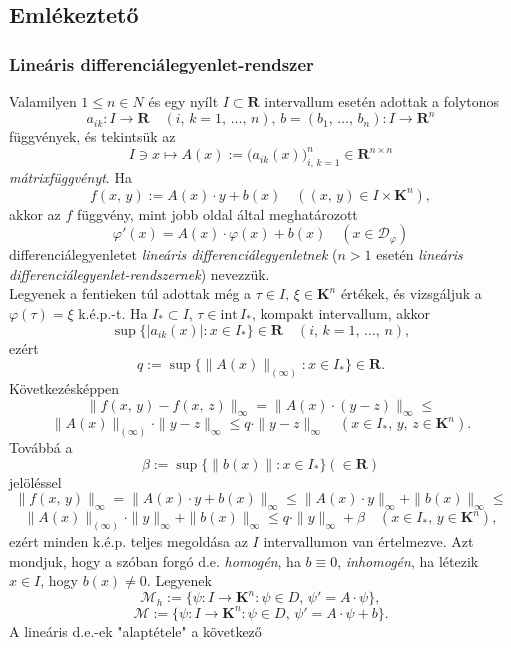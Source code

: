 \documentclass{article}
\newcommand{\R}{\mathbf{R}}
\newcommand{\K}{\mathbf{K}}
\newcommand{\Dp}{\mathcal{D}_\varphi}
\begin{document}
	\subsection{Emlékeztető}
	\subsubsection{Lineáris differenciálegyenlet-rendszer}
	Valamilyen $1 \leq n \in N$ és egy nyílt $I \subset \R$ intervallum esetén adottak a folytonos
	\[
		a_{ik} : I \to \R \quad (i, \, k = 1, \, \dots, \, n), \, b = (b_1, \, \dots, \, b_n) : I \to \R^n
	\]
	függvények, és tekintsük az
	\[
		I \ni x \mapsto A(x) := \big( a_{ik}(x) \big)_{i, \, k =1}^n \in \R^{n \times n}
	\]
	\textit{mátrixfüggvényt}. Ha
	\[
		f(x, \, y) := A(x) \cdot y + b(x) \quad ((x, \, y) \in I \times \K^n),
	\]
	akkor az $f$ függvény, mint jobb oldal által meghatározott
	\[
		\varphi'(x) = A(x) \cdot \varphi(x) + b(x) \quad (x \in \Dp)
	\]
	differenciálegyenletet \textit{lineáris differenciálegyenletnek} ($n > 1$ esetén \textit{lineáris} \textit{differenciálegyenlet-rendszernek}) nevezzük.\\
	
	Legyenek a fentieken túl adottak még a $\tau \in I, \, \xi \in \K^n$ értékek, és vizsgáljuk a $\varphi(\tau) = \xi$ k.é.p.-t. Ha $I_* \subset I$, $\tau \in \text{int} \, I_*$, kompakt intervallum, akkor
	\[
		\sup \{ |a_{ik}(x)| : x \in I_* \} \in \R \quad (i, \, k = 1, \, \dots, \, n),
	\]
	ezért
	\[
		q := \sup \{ \|A(x)\|_{(\infty)} : x \in I_* \} \in \R.
	\]
	Következésképpen
	\[
		\| f(x, \, y) - f(x, \, z) \|_\infty = \| A(x) \cdot (y- z) \|_\infty \leq
	\]
	\[
		\|A(x)\|_{(\infty)} \cdot \|y-z\|_\infty \leq q \cdot \|y-z\|_\infty \quad (x \in I_*, \, y, \, z \in \K^n).
	\]
	Továbbá a
	\[
		\beta := \sup\{\|b(x)\| : x \in I_*\} (\in \R)
	\]
	jelöléssel
	\[
		\|f(x, \, y)\|_\infty = \| A(x) \cdot y + b(x) \|_\infty \leq \|A(x) \cdot y\|_\infty + \|b(x)\|_\infty \leq
	\]
	\[
		\|A(x)\|_{(\infty)} \cdot \|y\|_\infty + \|b(x)\|_\infty \leq q \cdot \|y\|_\infty + \beta \quad (x \in I_*, \, y \in \K^n),
	\]
	ezért minden k.é.p. teljes megoldása az $I$ intervallumon van értelmezve. Azt mondjuk, hogy a szóban forgó d.e. \textit{homogén}, ha $b \equiv 0$, \textit{inhomogén}, ha létezik $x \in I$, hogy $b(x) \neq 0$. Legyenek
	\[
		\mathcal{M}_h := \{ \psi : I \to \K^n : \psi \in D, \, \psi' = A \cdot \psi \},
	\]
	\[
		\mathcal{M} := \{ \psi : I \to \K^n : \psi \in D, \, \psi' = A \cdot \psi + b\}.
	\]
	A lineáris d.e.-ek "alaptétele" a következő\\
	
\end{document}
